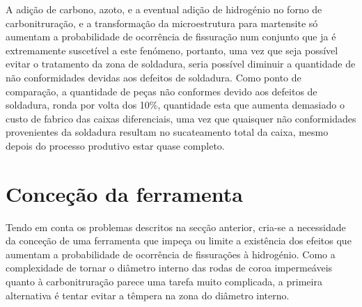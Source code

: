 \par
A adição de carbono, azoto, e a eventual adição de hidrogénio no forno de carbonitruração, e a transformação da microestrutura para martensite só aumentam a probabilidade de ocorrência de fissuração num conjunto que ja é extremamente suscetível a este fenómeno, portanto, uma vez que seja possível evitar o tratamento da zona de soldadura, seria possível diminuir a quantidade de não conformidades devidas aos defeitos de soldadura. Como ponto de comparação, a quantidade de peças não conformes devido aos defeitos de soldadura, ronda por volta dos 10\%, quantidade esta que aumenta demasiado o custo de fabrico das caixas diferenciais, uma vez que quaisquer não conformidades provenientes da soldadura resultam no sucateamento total da caixa, mesmo depois do processo produtivo estar quase completo.
\section{Conceção da ferramenta} \label{sec:materiais_concecao}
Tendo em conta os problemas descritos na secção anterior, cria-se a necessidade da conceção de uma ferramenta que impeça ou limite a existência dos efeitos que aumentam a probabilidade de ocorrência de fissurações à hidrogénio. Como a complexidade de tornar o diâmetro interno das rodas de coroa impermeáveis quanto à carbonitruração parece uma tarefa muito complicada, a primeira alternativa é tentar evitar a têmpera na zona do diâmetro interno.
